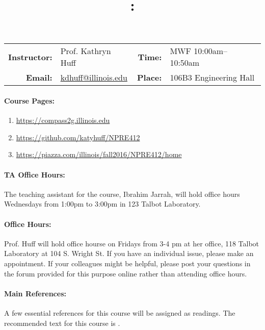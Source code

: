\documentclass[11pt, a4paper]{article}
\title{\CourseNumber: \CourseTitle\\}
\author{\CourseUniversity}
\date{\CourseSemester \CourseYear}
\makeatletter
\newcommand{\CourseNumber}{NPRE412}
\newcommand{\CourseInstructor}{Prof. Kathryn Huff\xspace}%
\newcommand{\CourseDays}{MWF\xspace}%
\newcommand{\CourseStart}{10:00am\xspace}%
\newcommand{\CourseEnd}{10:50am\xspace}%
\newcommand{\CourseInstructorEmail}{kdhuff@illinois.edu}
\newcommand{\CourseRoom}{106B3\xspace}%
\newcommand{\CourseBuilding}{Engineering Hall\xspace}%
\newcommand{\TeachingAssistant}{Ibrahim Jarrah\xspace}%
\newcommand{\TAOfficeHourDays}{Wednesdays\xspace}%
\newcommand{\TAOfficeHourStart}{1:00pm\xspace}%
\newcommand{\TAOfficeHourEnd}{3:00pm\xspace}%
\newcommand{\TAOfficeHourPlace}{123 Talbot Laboratory\xspace}
\makeatother
\begin{document}
\maketitle
\renewcommand{\arraystretch}{1.5}
\begin{center}
\begin{table}[h]
\begin{tabularx}{\textwidth}{rXrX}
\hline
\textbf{Instructor:} & \CourseInstructor & \textbf{Time:} & \CourseDays \CourseStart -- \CourseEnd \\
\textbf{Email:} &  \href{mailto:\CourseInstructorEmail}{\CourseInstructorEmail} & \textbf{Place:} & \CourseRoom \CourseBuilding\\
\end{tabularx}
\end{table}
\end{center}

\paragraph{Course Pages:}
\begin{enumerate}
        \item \url{https://compass2g.illinois.edu}
        \item \url{https://github.com/katyhuff/\CourseNumber}
        \item \url{https://piazza.com/illinois/fall2016/\CourseNumber/home}
\end{enumerate}

\paragraph{TA Office Hours:} The teaching assistant for the course, 
\TeachingAssistant, will hold office hours \TAOfficeHourDays from 
\TAOfficeHourStart to \TAOfficeHourEnd in \TAOfficeHourPlace.

\paragraph{Office Hours:} Prof. Huff will hold office hourse on Fridays from 
3-4 pm at her office, 118 Talbot Laboratory at 104 S. Wright St. If you have an 
individual issue, please make an appointment. If your colleagues might be 
helpful, please post your questions in the forum provided for this purpose 
online rather than attending office hours.

\paragraph{Main References:}
A few essential references for this course will be assigned as readings. The 
recommended text for this course is \cite{tsoulfanidis_nuclear_2013}.

\renewcommand{\refname}{\normalfont\selectfont\normalsize}\vspace{-1cm} 

\end{document}
